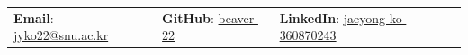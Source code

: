 \documentclass[letterpaper, 11pt]{article}
\begin{document}


\vspace{0.5cm} 
\begin{center}
\begin{tabular}{lll}
\textbf{Email}: \href{mailto:jyko22@snu.ac.kr}{jyko22@snu.ac.kr}      &
\hspace{0.50in} \textbf{GitHub}: \href{https://github.com/beaver-22}{beaver-22}    &
\hspace{0.50in} \textbf{LinkedIn}: \href{https://www.linkedin.com/in/jaeyong-ko-360870243/}{jaeyong-ko-360870243} \\

\end{tabular}
\end{center}


\setlength{\tabcolsep}{8pt}
\end{document}
